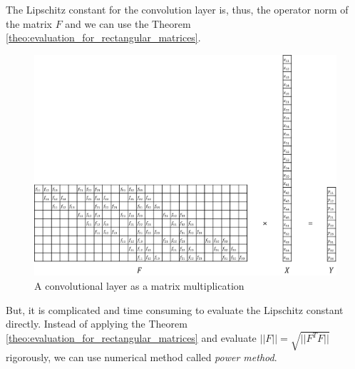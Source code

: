 \documentclass[11pt]{report}
\begin{document}
The Lipschitz constant for the convolution layer is, thus, the operator norm of the matrix \(F\) and we can use the Theorem \ref{theo:evaluation_for_rectangular_matrices}.


\begin{figure}[h]
\centering
\includegraphics[width=\textwidth]{convolution_matrix}
\caption{A convolutional layer as a matrix multiplication}
\label{convolution_matrix}
\end{figure}

But, it is complicated and time consuming to evaluate the Lipschitz constant directly.
Instead of applying the Theorem \ref{theo:evaluation_for_rectangular_matrices} and evaluate \(||F||=\sqrt{||F^TF||}\) rigorously, we can use numerical method called \emph{power method}.
\end{document}
